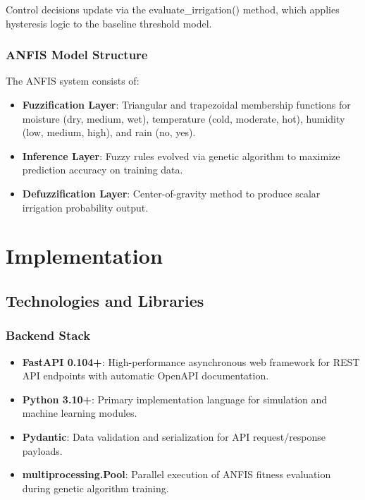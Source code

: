 Control decisions update via the evaluate\_irrigation() method, which applies hysteresis logic to the baseline threshold model.

\subsubsection{ANFIS Model Structure}

The ANFIS system consists of:
\begin{itemize}
    \item \textbf{Fuzzification Layer}: Triangular and trapezoidal membership functions for moisture (dry, medium, wet), temperature (cold, moderate, hot), humidity (low, medium, high), and rain (no, yes).
    \item \textbf{Inference Layer}: Fuzzy rules evolved via genetic algorithm to maximize prediction accuracy on training data.
    \item \textbf{Defuzzification Layer}: Center-of-gravity method to produce scalar irrigation probability output.
\end{itemize}


\section{Implementation}
\label{sec:ch3sec3}

\subsection{Technologies and Libraries}

\subsubsection{Backend Stack}

\begin{itemize}
    \item \textbf{FastAPI 0.104+}: High-performance asynchronous web framework for REST API endpoints with automatic OpenAPI documentation.
    \item \textbf{Python 3.10+}: Primary implementation language for simulation and machine learning modules.
    \item \textbf{Pydantic}: Data validation and serialization for API request/response payloads.
    \item \textbf{multiprocessing.Pool}: Parallel execution of ANFIS fitness evaluation during genetic algorithm training.
\end{itemize}

